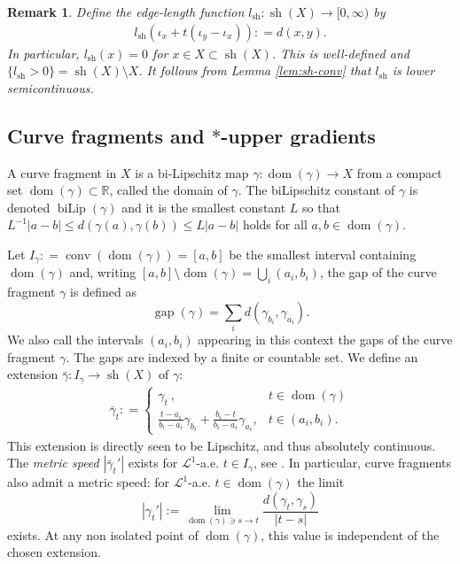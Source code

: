 \documentclass{amsart}
\newtheorem{remark}[theorem]{Remark}
\numberwithin{equation}{section}
\newcommand{\R}{\mathbb{R}}
\newcommand{\leb}{\mathcal{L}}
\newcommand{\biLip}{\operatorname{biLip}}
\newcommand{\dom}{\operatorname{dom}}
\newcommand{\conv}{\operatorname{conv}}
\newcommand{\sh}{\operatorname{sh}}
\newcommand{\defl}{\mathrel{\mathop:}=}
\begin{document}
\begin{remark}\label{rmk:edge-length}
Define the \emph{edge-length function} $l_{\sh}:\sh(X)\to [0,\infty)$ by
\begin{align*}
    l_{\sh}(\iota_x+t(\iota_y-\iota_x))\defl d(x,y).
\end{align*}
In particular, $l_{\sh}(x)=0$ for $x\in X\subset \sh(X)$. 
This is well-defined and $\{l_{\sh}>0\}=\sh(X)\setminus X$. It follows from Lemma \ref{lem:sh-conv} that $l_{\sh}$ is lower semicontinuous.
\end{remark}

\subsection{Curve fragments and $\ast$-upper gradients}\label{sec:frag+star-ug}  A curve fragment in $X$ is a bi-Lipschitz map $\gamma:\dom(\gamma)\to X$ from a compact set $\dom(\gamma)\subset \R$, called the domain of $\gamma$. The biLipschitz constant of $\gamma$ is denoted $\biLip(\gamma)$ and it is the smallest constant $L$ so that $L^{-1}|a-b| \leq d(\gamma(a),\gamma(b)) \leq L |a-b|$ holds for all $a,b\in \dom(\gamma)$.

Let $I_\gamma\defl \conv(\dom(\gamma))=[a,b]$ be the smallest interval containing $\operatorname{dom}(\gamma)$ and, writing $\displaystyle [a,b]\setminus \dom(\gamma)=\bigcup_i(a_i,b_i)$, the gap of the curve fragment $\gamma$ is defined as  
\[
\operatorname{gap}(\gamma)= \sum_i d(\gamma_{b_i},\gamma_{a_i}).
\]
We also call the intervals $(a_i,b_i)$ appearing in this context the gaps of the curve fragment $\gamma$.  The gaps are indexed by a finite or countable set. 
We define an extension $\bar\gamma:I_\gamma\to \sh(X)$ of $\gamma$:
\begin{align*}
\bar\gamma_t\defl
\left\{
\begin{array}{ll}
   \gamma_t\ ,  & t\in \dom(\gamma) \\
    \frac{t-a_i}{b_i-a_i}\gamma_{b_i}+\frac{b_i-t}{b_i-a_i}\gamma_{a_i} , & t\in (a_i,b_i).
\end{array}
\right.
\end{align*}
This extension is directly seen to be Lipschitz, and thus absolutely continuous.
The \emph{metric speed} $|\bar\gamma_t'|$ exists for $\leb^1$-a.e. $t\in I_\gamma$, see \cite[Theorem 4.1.6]{ambrosiotilli}.
In particular, curve fragments also admit a metric speed: for $\leb^1$-a.e. $t\in \dom(\gamma)$ the limit
\[
|\gamma_t'|:= \lim_{\dom(\gamma)\ni s\to t}\frac{d(\gamma_t,\gamma_s)}{|t-s|}
\]
exists.
At any non isolated point of $\dom(\gamma)$, this value is independent of the chosen extension.
\end{document}
